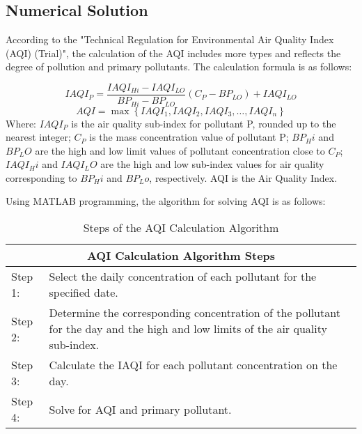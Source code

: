 \documentclass[12pt]{article}
\begin{document}

\subsection{ Numerical Solution}
According to the "Technical Regulation for Environmental Air Quality Index (AQI) (Trial)", the calculation of the AQI includes more types and reflects the degree of pollution and primary pollutants. The calculation formula is as follows:

\begin{equation}
		I A Q I_P=\frac{I A Q I_{H i}-I A Q I_{L O}}{B P_{H i}-B P_{L O}}\left(C_P-B P_{L O}\right)+I A Q I_{L O} 
\end{equation}
\begin{equation}
A Q I=\max \left\{I A Q I_1, I A Q I_2, I A Q I_3, \ldots, I A Q I_n\right\}
\end{equation}
Where: $IAQI_P$ is the air quality sub-index for pollutant P, rounded up to the nearest integer; $C_P$ is the mass concentration value of pollutant P; $BP_Hi$ and $BP_LO$ are the high and low limit values of pollutant concentration close to $C_P$;$IAQI_Hi$ and $IAQI_LO$ are the high and low sub-index values for air quality corresponding to $BP_Hi$ and $BP_Lo$, respectively. AQI is the Air Quality Index.

Using MATLAB programming, the algorithm for solving AQI is as follows:

\begin{table}[h!]
	\centering
	\caption{Steps of the AQI Calculation Algorithm}
	\begin{tabular}{lp{10cm}}
		\hline
		\multicolumn{2}{c}{ AQI Calculation Algorithm Steps} \\
		\hline
		Step 1: & Select the daily concentration of each pollutant for the specified date. \\
		Step 2: & Determine the corresponding concentration of the pollutant for the day and the high and low limits of the air quality sub-index. \\
		Step 3: & Calculate the IAQI for each pollutant concentration on the day. \\
		Step 4: & Solve for AQI and primary pollutant. \\
		\hline
	\end{tabular}
	\label{tab3}
\end{table}
\end{document}
